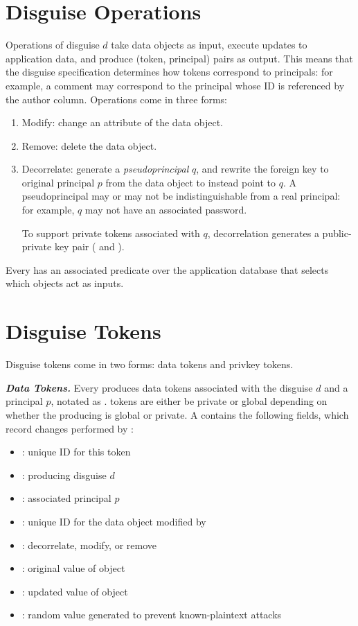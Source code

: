 \section{Disguise Operations} 
Operations  of disguise $d$ take data objects as input, execute updates to application
data, and produce (token, principal) pairs
as output. This means that the disguise specification determines how tokens correspond to
principals: for example, a comment may correspond to the principal whose ID is referenced by the
author column.
Operations come in three forms:
\begin{enumerate}
    \item Modify: change an attribute of the data object.
    \item Remove: delete the data object.
    \item Decorrelate: generate a \emph{pseudoprincipal} $q$, and rewrite the foreign key to original
        principal $p$ from the data object to instead point to $q$.
        A pseudoprincipal may or may not be indistinguishable from a real principal: for example,
        $q$ may not have an associated password.

        To support private tokens associated with $q$, decorrelation generates a
        public-private key pair ( and ).
\end{enumerate}
Every  has an associated predicate over the application database that selects which objects
act as  inputs.

\section{Disguise Tokens} 
Disguise tokens come in two forms: data tokens and privkey tokens.

\vspace{6pt}
\noindent\textbf{\emph{Data Tokens.}}
Every  produces data tokens associated with the disguise $d$ and a
principal $p$, notated as .  tokens are either be private or global depending on
whether the producing  is global or private. 
A  contains the following fields, which record changes performed by :
\begin{itemize}
\item {}: unique ID for this token
\item {}: producing disguise $d$ 
\item {}: associated principal $p$
\item {}: unique ID for the data object modified by 
\item {}: decorrelate, modify, or remove
\item {}: original value of object 
\item {}: updated value of object 
\item {}: random value generated to prevent known-plaintext attacks
\end{itemize}

